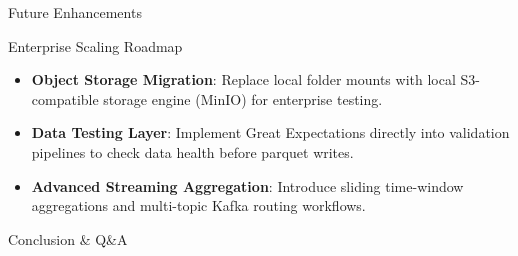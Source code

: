 \documentclass[10pt]{beamer}
\begin{document}
\begin{frame}{Future Enhancements}
  \begin{block}{Enterprise Scaling Roadmap}
    \begin{itemize}
      \item \textbf{Object Storage Migration}: Replace local folder mounts with local S3-compatible storage engine (MinIO) for enterprise testing.
      \item \textbf{Data Testing Layer}: Implement Great Expectations directly into validation pipelines to check data health before parquet writes.
      \item \textbf{Advanced Streaming Aggregation}: Introduce sliding time-window aggregations and multi-topic Kafka routing workflows.
    \end{itemize}
  \end{block}
\end{frame}

\begin{frame}[standout]
  Conclusion \& Q\&A
\end{frame}
\end{document}
